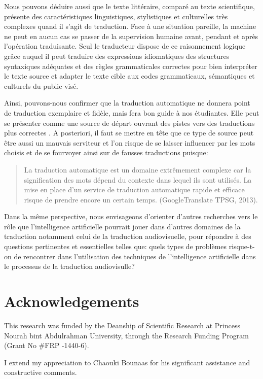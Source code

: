 \documentclass{textolivre}
\begin{document}
Nous pouvons déduire aussi que le texte littéraire, comparé au texte scientifique, présente des caractéristiques linguistiques, stylistiques et culturelles très complexes quand il s’agit de traduction. Face à une situation pareille, la machine ne peut en aucun cas se passer de la supervision humaine avant, pendant et après l’opération traduisante. Seul le traducteur dispose de ce raisonnement logique grâce auquel il peut traduire des expressions idiomatiques des structures syntaxiques adéquates et des règles grammaticales correctes pour bien interpréter le texte source et adapter le texte cible aux codes grammaticaux, sémantiques et culturels du public visé.

Ainsi, pouvons-nous confirmer que la traduction automatique ne donnera point de traduction exemplaire et fidèle, mais fera bon guide à nos étudiantes. Elle peut se présenter comme une source de départ ouvrant des pistes vers des traductions plus correctes \cite{gile2005}.  A posteriori, il faut se mettre en tête que ce type de source peut être aussi un mauvais serviteur et l’on risque de se laisser influencer par les mots choisis et de se fourvoyer ainsi sur de fausses traductions \cite[p. 214]{aubin1995} puisque:
 
\begin{quote}La traduction automatique est un domaine extrêmement complexe car la signification des mots dépend du contexte dans lequel ils sont utilisés. La mise en place d’un service de traduction automatique rapide et efficace risque de prendre encore un certain temps. (GoogleTranslate TPSG, 2013).
\end{quote}

Dans la même perspective, nous envisageons d’orienter d’autres recherches vers le rôle que l’intelligence artificielle pourrait jouer dans d’autres domaines de la traduction notamment celui de la traduction audiovisuelle, pour répondre à des questions pertinentes et essentielles telles que: quels types de problèmes risque-t-on de rencontrer dans l’utilisation des techniques de l’intelligence artificielle dans le processus de la traduction audiovisulle?

\section{Acknowledgements}\label{sec-agradecimentos}
This research was funded by the Deanship of Scientific Research at Princess Nourah bint Abdulrahman University, through the Research Funding Program (Grant  No \#FRP -1440-6).

I extend my appreciation to Chaouki Bounaas for his significant assistance and constructive comments.

\printbibliography\label{sec-bib}
\end{document}
